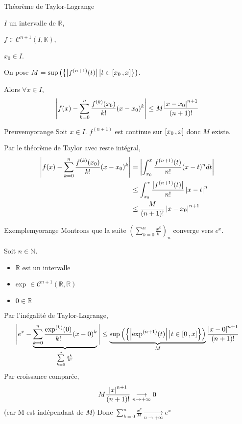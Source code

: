     \begin{coro}{Théorème de Taylor-Lagrange}{}
        \begin{soient}
            \item $I$ un intervalle de $\mathbb{R}$,
            \item $f \in \mathcal{C}^{n+1}(I,\mathbb{K})$,
            \item $x_0 \in I$.
        \end{soient}
        On pose $M = \sup\left(\left\{ \left\lvert f^{(n+1)}(t)\right\rvert \big| t \in \left[ x_0 \, , x \right] \right\}\right)$. 
        
        Alors $\forall x \in I$, \[ \left\lvert f(x) - \sum\limits_{k=0}^n \frac{f^{(k)}(x_0)}{k!}(x-x_0)^k\right\rvert \leq M\frac{\left\lvert x-x_0\right\rvert^{n+1}}{(n+1)!} \]
    \end{coro}

    \begin{demo}{Preuve}{myorange}
        Soit $x \in I$. $f^{(n+1)}$ est continue sur $\left[ x_0 \, , x \right]$ donc $M$ existe.
        
        Par le théorème de Taylor avec reste intégral, 
        \begin{align*}
            \left\lvert f(x) - \sum\limits_{k=0}^n \frac{f^{(k)}(x_0)}{k!}(x-x_0)^k\right\rvert &= \left\lvert \int_{x_0}^{x} \frac{f^{(n+1)}(t)}{n!}(x-t)^n dt\right\rvert \\
            &\leq \int_{x_0}^{x} \frac{\left\lvert f^{(n+1)}(t)\right\rvert}{n!} \left\lvert x-t\right\rvert^n \\
            & \leq \frac{M}{(n+1)!}\left\lvert x-x_0\right\rvert^{n+1}
        \end{align*}
    \end{demo}

    \begin{omed}{Exemple}{myorange}
        Montrons que la suite $\left(\sum\limits_{k=0}^n \frac{x^k}{k!}\right)_n$ converge vers $e^x$.
    
        Soit $n \in \mathbb{N}$. 
        \begin{itemize}[label=\diamond]
            \item $\mathbb{R}$ est un intervalle
            \item exp $\in \mathcal{C}^{n+1}(\mathbb{R},\mathbb{R})$
            \item $0 \in \mathbb{R}$
        \end{itemize}
        Par l’inégalité de Taylor-Lagrange, 
        \[ \Bigg\lvert e^x - \underbrace{\sum\limits_{k=0}^n \frac{\exp^{(k)}(0)}{k!}(x-0)^k}_{ \sum\limits_{k=0}^n \frac{x^k}{k!}} \Bigg\rvert \leq \underbrace{\sup\left(\left\{ \left\lvert \exp^{(n+1)}(t)\right\rvert \big| t \in \left[ 0 \, , x \right]\right\}\right)}_M \frac{\left\lvert x-0\right\rvert^{n+1}}{(n+1)!} \]
        Par croissance comparée, \[ M \frac{\left\lvert x\right\rvert^{n+1}}{(n+1)!} \underset{n \rightarrow +\infty}{\longrightarrow} 0\] (car M est indépendant de $M$)
        Donc $\sum\limits_{k=0}^n \frac{x^k}{k!} \underset{n \rightarrow +\infty}{\longrightarrow} e^x$
    \end{omed}

